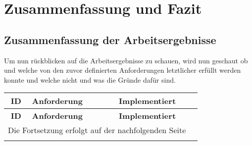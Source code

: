 
\chapter{Zusammenfassung und Fazit }
\label{chapter:7}

\section{Zusammenfassung der Arbeitsergebnisse}

Um nun rückblicken auf die Arbeitsergebnisse zu schauen, wird nun geschaut ob und welche von den zuvor definierten Anforderungen letztlicher erfüllt werden konnte und welche nicht und was die Gründe dafür sind.

\begin{longtable}{|c|l|c|c|}

    \hline
    \textbf{ID}          &
    \textbf{Anforderung} &
    \textbf{Implementiert}                                                                 \\ \hline
    \endfirsthead

    \hline
    \textbf{ID}          &
    \textbf{Anforderung} &
    \textbf{Implementiert}                                                                 \\ \hline
    \endhead

    \hline
    \multicolumn{3}{|r|}{{Die Fortsetzung erfolgt auf der nachfolgenden Seite}}            \\ \hline
    \endfoot

    \endlastfoot


\end{longtable}
